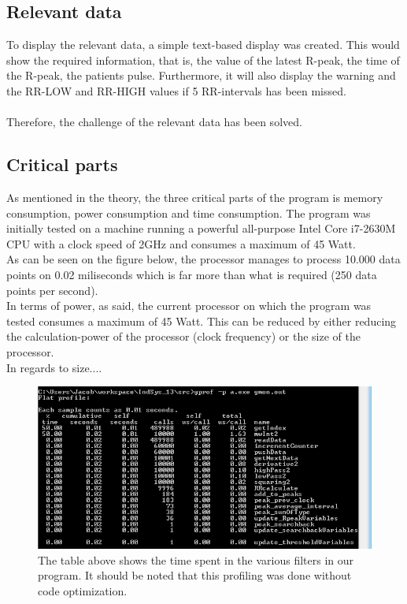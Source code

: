 \documentclass[12pt,a4paper]{article}
\begin{document}
\subsection{Relevant data}
	To display the relevant data, a simple text-based display was created. This would show the required information, that is, the value of the latest R-peak, the time of the R-peak, the patients pulse. Furthermore, it will also display the warning and the RR-LOW and RR-HIGH values if 5 RR-intervals has been missed.\\
	\\
	Therefore, the challenge of the relevant data has been solved.
\subsection{Critical parts}
	As mentioned in the theory, the three critical parts of the program is memory consumption, power consumption and time consumption. The program was initially tested on a machine running a powerful all-purpose Intel Core i7-2630M CPU with a clock speed of 2GHz and consumes a maximum of 45 Watt. \\
	As can be seen on the figure below, the processor manages to process 10.000 data points on 0.02 miliseconds which is far more than what is required (250 data points per second).\\
	In terms of power, as said, the current processor on which the program was tested consumes a maximum of 45 Watt. This can be reduced by either reducing the calculation-power of the processor (clock frequency) or the size of the processor.\\
	In regards to size....	
	\begin{figure}[h!]
		\centering
			\includegraphics[width=1\textwidth]{Screenshots/time_result.png}
		\caption{The table above shows the time spent in the various filters in our program. It should be noted that this profiling was done without code optimization.}
		\label{time_result}
	\end{figure}
	
\end{document}
